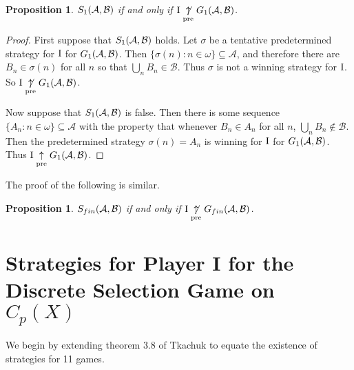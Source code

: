 \documentclass{amsart}
\theoremstyle{plain}
\newtheorem{proposition}[theorem]{Proposition}
\theoremstyle{definition}
\theoremstyle{remark}
\theoremstyle{plain}
\theoremstyle{definition}
\theoremstyle{remark}
\begin{document}
\begin{proposition}
  \(S_{1}(\mathcal{A},\mathcal{B})\) if and only if 
  \(\mathrm{I} \underset{\text{pre}}{\not\uparrow}G_{1}(\mathcal{A},\mathcal{B})\).
\end{proposition}
\begin{proof}
 First suppose that \(S_{1}(\mathcal{A},\mathcal{B})\) holds.
 Let \(\sigma\) be a tentative predetermined strategy for \(\mathrm{I}\) for \(G_{1}(\mathcal{A},\mathcal{B})\).
 Then \(\{\sigma(n) : n \in \omega\} \subseteq \mathcal{A}\), and therefore there are \(B_n \in \sigma(n)\) for all \(n\) so that \(\bigcup_n B_n \in \mathcal{B}\).
 Thus \(\sigma\) is not a winning strategy for \(\mathrm{I}\).
 So \(\mathrm{I} \underset{\text{pre}}{\not\uparrow}G_{1}(\mathcal{A},\mathcal{B})\).
 
 Now suppose that \(S_{1}(\mathcal{A},\mathcal{B})\) is false.
 Then there is some sequence \(\{A_n : n \in \omega\} \subseteq \mathcal{A}\) with the property that whenever \(B_n \in A_n\) for all \(n\), \(\bigcup_n B_n \notin \mathcal{B}\).
 Then the predetermined strategy \(\sigma(n) = A_n\) is winning for \(\mathrm{I}\) for \(G_{1}(\mathcal{A},\mathcal{B})\).
 Thus \(\mathrm{I} \underset{\text{pre}}{\uparrow}G_{1}(\mathcal{A},\mathcal{B})\).
\end{proof}

The proof of the following is similar.

\begin{proposition}
  \(S_{fin}(\mathcal{A},\mathcal{B})\) if and only if 
  \(\mathrm{I} \underset{\text{pre}}{\not\uparrow}G_{fin}(\mathcal{A},\mathcal{B})\).
\end{proposition}


\section{Strategies for Player I for the Discrete Selection Game on \(C_p(X)\)}

We begin by extending theorem 3.8 of Tkachuk\cite{Tkachuk3} to equate the existence of strategies for 11 games.
\end{document}
